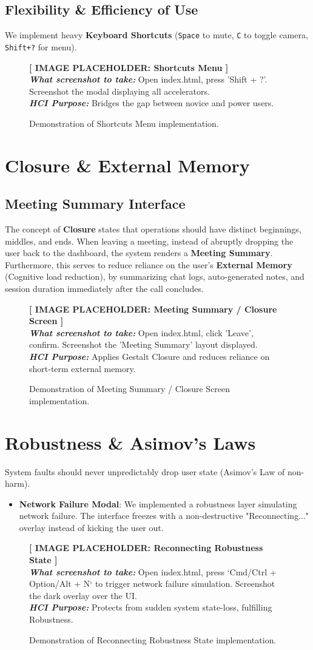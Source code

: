 \documentclass[12pt,a4paper]{article}
\newcommand{\imageplaceholder}[3]{
    \begin{figure}[H]
        \centering
        \begin{tcolorbox}[colback=placeholderbg,colframe=placeholderborder,arc=4mm,height=7.5cm,valign=center,halign=center]
            {\Large\textbf{\textcolor{hciblue}{[ IMAGE PLACEHOLDER: #1 ]}}}\\[0.5cm]
            \textit{\textbf{What screenshot to take:}} #2\\[0.3cm]
            \textit{\textbf{HCI Purpose:}} #3
        \end{tcolorbox}
        \caption{Demonstration of #1 implementation.}
    \end{figure}
}
\begin{document}
\subsection{Flexibility \& Efficiency of Use}
We implement heavy \textbf{Keyboard Shortcuts} (\texttt{Space} to mute, \texttt{C} to toggle camera, \texttt{Shift+?} for menu).
\imageplaceholder{Shortcuts Menu}{Open index.html, press 'Shift + ?'. Screenshot the modal displaying all accelerators.}{Bridges the gap between novice and power users.}

\section{Closure \& External Memory}

\subsection{Meeting Summary Interface}
The concept of \textbf{Closure} states that operations should have distinct beginnings, middles, and ends. When leaving a meeting, instead of abruptly dropping the user back to the dashboard, the system renders a \textbf{Meeting Summary}.
Furthermore, this serves to reduce reliance on the user's \textbf{External Memory} (Cognitive load reduction), by summarizing chat logs, auto-generated notes, and session duration immediately after the call concludes.
\imageplaceholder{Meeting Summary / Closure Screen}{Open index.html, click 'Leave', confirm. Screenshot the 'Meeting Summary' layout displayed.}{Applies Gestalt Closure and reduces reliance on short-term external memory.}

\section{Robustness \& Asimov's Laws}
System faults should never unpredictably drop user state (Asimov's Law of non-harm). 
\begin{itemize}
    \item \textbf{Network Failure Modal}: We implemented a robustness layer simulating network failure. The interface freezes with a non-destructive "Reconnecting..." overlay instead of kicking the user out.
\end{itemize}
\imageplaceholder{Reconnecting Robustness State}{Open index.html, press `Cmd/Ctrl + Option/Alt + N` to trigger network failure simulation. Screenshot the dark overlay over the UI.}{Protects from sudden system state-loss, fulfilling Robustness.}
\end{document}
